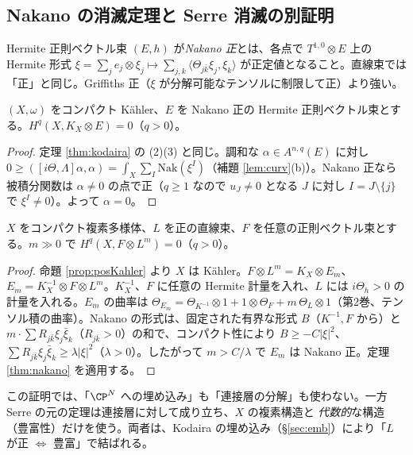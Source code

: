 \subsection{Nakano の消滅定理と Serre 消滅の別証明}
\begin{defn}[Nakano 正]
Hermite 正則ベクトル束 $(E,h)$ が\emph{Nakano 正}とは、各点で $T^{1,0}\otimes E$ 上の Hermite 形式 $\xi=\sum_je_j\otimes\xi_j\mapsto\sum_{j,k}\langle\Theta_{j\bar k}\xi_j,\xi_k\rangle$ が正定値となること。直線束では「正」と同じ。Griffiths 正（$\xi$ が分解可能なテンソルに制限して正）より強い。
\end{defn}
\begin{thm}\label{thm:nakano}\tP
$(X,\omega)$ をコンパクト Kähler、$E$ を Nakano 正の Hermite 正則ベクトル束とする。$H^q(X,K_X\otimes E)=0$（$q>0$）。
\end{thm}
\begin{proof}
定理 \ref{thm:kodaira} の (2)(3) と同じ。調和な $\alpha\in A^{n,q}(E)$ に対し $0\ge([i\Theta,\Lambda]\alpha,\alpha)=\int_X\sum_I\mathrm{Nak}(\xi^I)$（補題 \ref{lem:curv}(b)）。Nakano 正なら被積分関数は $\alpha\neq0$ の点で正（$q\ge1$ なので $u_J\ne0$ となる $J$ に対し $I=J\setminus\{j\}$ で $\xi^I\ne0$）。よって $\alpha=0$。
\end{proof}
\begin{thm}\label{thm:serreNakano}\tP
$X$ をコンパクト複素多様体、$L$ を正の直線束、$F$ を任意の正則ベクトル束とする。$m\gg0$ で $H^q(X,F\otimes L^m)=0$（$q>0$）。
\end{thm}
\begin{proof}
命題 \ref{prop:posKahler} より $X$ は Kähler。$F\otimes L^m=K_X\otimes E_m$、$E_m=K_X^{-1}\otimes F\otimes L^m$。$K_X^{-1}$、$F$ に任意の Hermite 計量を入れ、$L$ には $i\Theta_h>0$ の計量を入れる。$E_m$ の曲率は $\Theta_{E_m}=\Theta_{K^{-1}}\otimes1+1\otimes\Theta_F+m\,\Theta_L\otimes1$（第2巻、テンソル積の曲率）。Nakano の形式は、固定された有界な形式 $B$（$K^{-1},F$ から）と $m\cdot\sum R_{j\bar k}\xi_{j}\bar\xi_k$（$R_{j\bar k}>0$）の和で、コンパクト性により $B\ge-C|\xi|^2$、$\sum R_{j\bar k}\xi_j\bar\xi_k\ge\lambda|\xi|^2$（$\lambda>0$）。したがって $m>C/\lambda$ で $E_m$ は Nakano 正。定理 \ref{thm:nakano} を適用する。
\end{proof}
この証明では、「$\CP^N$ への埋め込み」も「連接層の分解」も使わない。一方 Serre の元の定理は連接層に対して成り立ち、$X$ の複素構造と \emph{代数的}な構造（豊富性）だけを使う。両者は、Kodaira の埋め込み（\S\ref{sec:emb}）により「$L$ が正 $\iff$ 豊富」で結ばれる。

